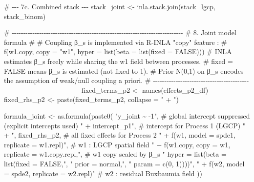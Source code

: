 \documentclass[
  letterpaper,
  DIV=11,
  numbers=noendperiod]{scrartcl}
\newenvironment{Shaded}{\begin{snugshade}}{\end{snugshade}}
\newcommand{\AttributeTok}[1]{\textcolor[rgb]{0.40,0.45,0.13}{#1}}
\newcommand{\CommentTok}[1]{\textcolor[rgb]{0.37,0.37,0.37}{#1}}
\newcommand{\FunctionTok}[1]{\textcolor[rgb]{0.28,0.35,0.67}{#1}}
\newcommand{\NormalTok}[1]{\textcolor[rgb]{0.00,0.23,0.31}{#1}}
\newcommand{\OtherTok}[1]{\textcolor[rgb]{0.00,0.23,0.31}{#1}}
\newcommand{\StringTok}[1]{\textcolor[rgb]{0.13,0.47,0.30}{#1}}
\begin{document}
\begin{Shaded}
\begin{Highlighting}[]
  \CommentTok{\# {-}{-}{-} 7c. Combined stack {-}{-}{-}}
\NormalTok{  stack\_joint }\OtherTok{\textless{}{-}} \FunctionTok{inla.stack.join}\NormalTok{(stack\_lgcp, stack\_binom)}

  \CommentTok{\# {-}{-}{-}{-}{-}{-}{-}{-}{-}{-}{-}{-}{-}{-}{-}{-}{-}{-}{-}{-}{-}{-}{-}{-}{-}{-}{-}{-}{-}{-}{-}{-}{-}{-}{-}{-}{-}{-}{-}{-}{-}{-}{-}{-}{-}{-}{-}{-}{-}{-}{-}{-}{-}{-}{-}{-}{-}{-}{-}{-}{-}{-}{-}{-}{-}{-}{-}{-}{-}{-}{-}{-}{-}{-}{-}}
  \CommentTok{\# 8. Joint model formula}
  \CommentTok{\#}
  \CommentTok{\# Coupling β\_s is implemented via R{-}INLA "copy" feature :}
  \CommentTok{\#   f(w1.copy, copy = "w1", hyper = list(beta = list(fixed = FALSE)))}
  \CommentTok{\# INLA estimates β\_s freely while sharing the w1 field between processes.}
  \CommentTok{\# fixed = FALSE means β\_s is estimated (not fixed to 1).}
  \CommentTok{\# Prior N(0,1) on β\_s encodes the assumption of weak/null coupling a priori.}
  \CommentTok{\# {-}{-}{-}{-}{-}{-}{-}{-}{-}{-}{-}{-}{-}{-}{-}{-}{-}{-}{-}{-}{-}{-}{-}{-}{-}{-}{-}{-}{-}{-}{-}{-}{-}{-}{-}{-}{-}{-}{-}{-}{-}{-}{-}{-}{-}{-}{-}{-}{-}{-}{-}{-}{-}{-}{-}{-}{-}{-}{-}{-}{-}{-}{-}{-}{-}{-}{-}{-}{-}{-}{-}{-}{-}{-}{-}}
\NormalTok{  fixed\_terms\_p2 }\OtherTok{\textless{}{-}} \FunctionTok{names}\NormalTok{(effects\_p2\_df)}
\NormalTok{  fixed\_rhs\_p2 }\OtherTok{\textless{}{-}} \FunctionTok{paste}\NormalTok{(fixed\_terms\_p2, }\AttributeTok{collapse =} \StringTok{" + "}\NormalTok{)}

\NormalTok{  formula\_joint }\OtherTok{\textless{}{-}} \FunctionTok{as.formula}\NormalTok{(}\FunctionTok{paste0}\NormalTok{(}
    \StringTok{"y\_joint \textasciitilde{} {-}1"}\NormalTok{, }\CommentTok{\# global intercept suppressed (explicit intercepts used)}
    \StringTok{" + intercept\_p1"}\NormalTok{, }\CommentTok{\# intercept for Process 1 (LGCP)}
    \StringTok{" + "}\NormalTok{, fixed\_rhs\_p2, }\CommentTok{\# all fixed effects for Process 2}
    \StringTok{" + f(w1, model = spde1, replicate = w1.repl)"}\NormalTok{, }\CommentTok{\# w1 : LGCP spatial field}
    \StringTok{" + f(w1.copy, copy = \textquotesingle{}w1\textquotesingle{}, replicate = w1.copy.repl,"}\NormalTok{, }\CommentTok{\# w1 copy scaled by β\_s}
    \StringTok{"     hyper = list(beta = list(fixed = FALSE,"}\NormalTok{,}
    \StringTok{"                              prior = \textquotesingle{}normal\textquotesingle{},"}\NormalTok{,}
    \StringTok{"                              param = c(0, 1))))"}\NormalTok{,}
    \StringTok{" + f(w2, model = spde2, replicate = w2.repl)"} \CommentTok{\# w2 : residual Buxbaumia field}
\NormalTok{  ))}


\end{Highlighting}
\end{Shaded}
\end{document}
